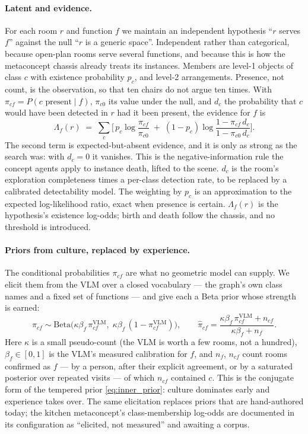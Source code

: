 \paragraph{Latent and evidence.}
For each room $r$ and function $f$ we maintain an independent hypothesis ``$r$ serves $f$'' against the null ``$r$
is a generic space''. Independent rather than categorical, because open-plan rooms serve several functions, and
because this is how the metaconcept chassis already treats its instances. Members are level-1 objects of class $c$
with existence probability $p_c$, and level-2 arrangements. Presence, not count, is the observation, so that ten
chairs do not argue ten times. With $\pi_{cf} = P(c \text{ present} \mid f)$, $\pi_{c0}$ its value under the null, and
$d_c$ the probability that $c$ would have been detected in $r$ had it been present, the evidence for $f$ is
\begin{equation}
    \Lambda_f(r) \;=\; \sum_c \Big[\, p_c \log\frac{\pi_{cf}}{\pi_{c0}}
    \;+\; (1 - p_c)\log\frac{1 - \pi_{cf}\, d_c}{1 - \pi_{c0}\, d_c} \Big].
    \label{eq:lh_function_evidence}
\end{equation}
The second term is expected-but-absent evidence, and it is only as strong as the search was: with $d_c = 0$ it
vanishes. This is the negative-information rule the concept agents apply to instance death, lifted to the scene.
$d_c$ is the room's exploration completeness times a per-class detection rate, to be replaced by a calibrated
detectability model. The weighting by $p_c$ is an approximation to the expected log-likelihood ratio, exact when
presence is certain. $\Lambda_f(r)$ is the hypothesis's existence log-odds; birth and death follow the chassis, and
no threshold is introduced.

\paragraph{Priors from culture, replaced by experience.}
The conditional probabilities $\pi_{cf}$ are what no geometric model can supply. We elicit them from the VLM over a
closed vocabulary --- the graph's own class names and a fixed set of functions --- and give each a Beta prior whose
strength is earned:
\begin{equation}
    \pi_{cf} \sim \mathrm{Beta}\big(\kappa\beta_f\,\pi^{\text{VLM}}_{cf},\; \kappa\beta_f\,(1-\pi^{\text{VLM}}_{cf})\big),
    \qquad
    \hat\pi_{cf} = \frac{\kappa\beta_f\,\pi^{\text{VLM}}_{cf} + n_{cf}}{\kappa\beta_f + n_f}.
    \label{eq:lh_beta_prior}
\end{equation}
Here $\kappa$ is a small pseudo-count (the VLM is worth a few rooms, not a hundred), $\beta_f \in [0,1]$ is the
VLM's measured calibration for $f$, and $n_f$, $n_{cf}$ count rooms confirmed as $f$ --- by a person, after their
explicit agreement, or by a saturated posterior over repeated visits --- of which $n_{cf}$ contained $c$. This is the
conjugate form of the tempered prior \eqref{eq:inner_prior}: culture dominates early and experience takes over. The
same elicitation replaces priors that are hand-authored today; the kitchen metaconcept's class-membership log-odds
are documented in its configuration as ``elicited, not measured'' and awaiting a corpus.

